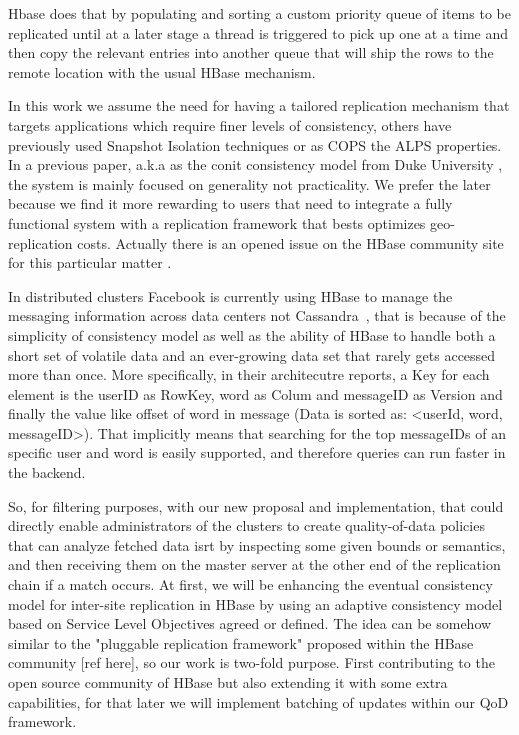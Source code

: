 Hbase does that by populating and sorting a custom priority queue of items to be replicated until at a later stage a thread is triggered to pick up one at a time and then copy the relevant entries into another queue that will ship the rows to the remote location with the usual HBase mechanism.

In this work we assume the need for having a tailored replication mechanism that targets applications which require finer levels of consistency, others have previously used Snapshot Isolation techniques or as COPS the ALPS properties. In a previous paper, a.k.a as the conit consistency model from Duke University \cite{Duke:2001}, the system is mainly focused on generality not practicality. We prefer the later because we find it more rewarding to users that need to integrate a fully functional system with a replication framework that bests optimizes geo-replication costs. Actually there is an opened issue on the HBase community site for this particular matter \cite{JIRA-1}. 

In distributed clusters Facebook is currently using HBase to manage the messaging information across data centers not Cassandra~\cite{FacebookHBase}, that is because of the simplicity of consistency model as well as the ability of HBase to handle both a short set of volatile data and an ever-growing data set that rarely gets accessed more than once. More specifically, in their architecutre reports, a Key for each element is the userID as RowKey, word as Colum and messageID as Version and finally the value like offset of word in message (Data is sorted as: <userId, word, messageID>). That implicitly means that searching for the top messageIDs of an specific user and word is easily supported, and therefore queries can run faster in the backend. 

So, for filtering purposes, with our new proposal and implementation, that could directly enable administrators of the clusters to create quality-of-data policies that can analyze fetched data  isrt by inspecting some given bounds or semantics, and then receiving them on the master server at the other end of the replication chain if a match occurs. At first, we will be enhancing the eventual consistency model for inter-site replication in HBase by using an adaptive consistency model based on Service Level Objectives agreed or defined. The idea can be somehow similar to the "pluggable replication framework" proposed within the HBase community [ref here], so our work is two-fold purpose. First contributing to the open source community of HBase but also extending it with some extra capabilities, for that later we will implement batching of updates within our QoD framework.

